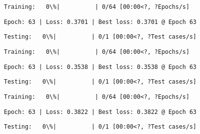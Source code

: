 \documentclass[11pt]{article}
\begin{document}
    
    
    \begin{Verbatim}[commandchars=\\\{\}]
Training:   0\%|          | 0/64 [00:00<?, ?Epochs/s]
    \end{Verbatim}

    
    \begin{Verbatim}[commandchars=\\\{\}]
Epoch: 63 | Loss: 0.3701 | Best loss: 0.3701 @ Epoch 63
    \end{Verbatim}

    
    \begin{Verbatim}[commandchars=\\\{\}]
Testing:   0\%|          | 0/1 [00:00<?, ?Test cases/s]
    \end{Verbatim}

    
    
    \begin{Verbatim}[commandchars=\\\{\}]
Training:   0\%|          | 0/64 [00:00<?, ?Epochs/s]
    \end{Verbatim}

    
    \begin{Verbatim}[commandchars=\\\{\}]
Epoch: 63 | Loss: 0.3538 | Best loss: 0.3538 @ Epoch 63
    \end{Verbatim}

    
    \begin{Verbatim}[commandchars=\\\{\}]
Testing:   0\%|          | 0/1 [00:00<?, ?Test cases/s]
    \end{Verbatim}

    
    
    \begin{Verbatim}[commandchars=\\\{\}]
Training:   0\%|          | 0/64 [00:00<?, ?Epochs/s]
    \end{Verbatim}

    
    \begin{Verbatim}[commandchars=\\\{\}]
Epoch: 63 | Loss: 0.3822 | Best loss: 0.3822 @ Epoch 63
    \end{Verbatim}

    
    \begin{Verbatim}[commandchars=\\\{\}]
Testing:   0\%|          | 0/1 [00:00<?, ?Test cases/s]
    \end{Verbatim}
\end{document}
